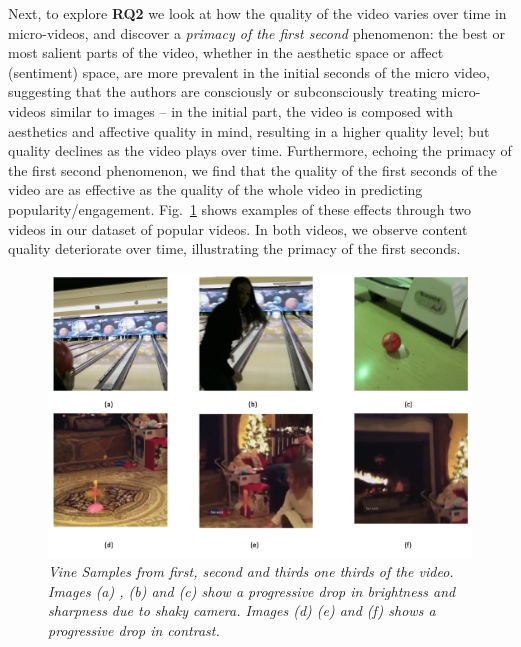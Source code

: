 Next, to explore \textbf{RQ2} we look at how the quality of the video varies over time in micro-videos, and discover a \emph{primacy of the first second} phenomenon: the best or most salient parts of the video, whether in the aesthetic space or affect (sentiment) space, are more prevalent in the initial seconds of the micro video, suggesting that the authors are consciously or subconsciously treating micro-videos similar to images -- in the initial part, the video is composed with aesthetics and affective quality in mind, resulting in a higher quality level; but quality declines as the video plays over time. Furthermore, echoing the primacy of the first second phenomenon, we find that the quality of the first seconds of the video are as effective as the quality of the whole video in predicting popularity/engagement. Fig.~\ref{fig:Vine_samples} shows examples of these effects through two videos in our dataset of popular videos. In both videos, we observe content quality deteriorate over time, illustrating the primacy of the first seconds. 
 
\begin{figure}[!tbh]
\centering
\includegraphics[width=\columnwidth]{figures/Vine_samples2}
\caption{\textsl{ Vine Samples from first, second and thirds one thirds of the video. Images (a) , (b) and (c) show a progressive drop in brightness and sharpness due to shaky camera. Images (d) (e) and (f) shows a progressive drop in contrast.}}
\label{fig:Vine_samples}
\end{figure}

